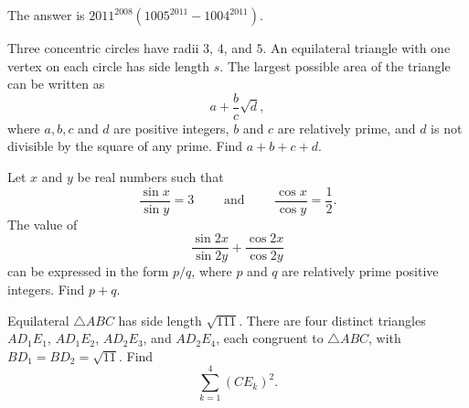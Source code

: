 \begin{solution}
	The answer is $\boxed{2011^{2008}(1005^{2011}-1004^{2011})}$.
\end{solution}






\begin{question}[name={2012 AIME I, \href{https://artofproblemsolving.com/community/c4p2630571}{Problem 13}}]
	Three concentric circles have radii $3$, $4$, and $5$. An equilateral triangle with one vertex on each circle has side length $s$. The largest possible area of the triangle can be written as $$a+\frac{b}{c}\sqrt{d},$$ where $a,b,c$ and $d$ are positive integers, $b$ and $c$ are relatively prime, and $d$ is not divisible by the square of any prime. Find $a+b+c+d$.
\end{question}


%	










\begin{question}[name={2012 AIME II, \href{https://artofproblemsolving.com/community/c4p2644151}{Problem 9}}]
	Let $x$ and $y$ be real numbers such that $$\frac{\sin{x}}{\sin{y}} = 3 \qquad \text{ and } \qquad \frac{\cos{x}}{\cos{y}} = \frac{1}{2}.$$ The value of $$\frac{\sin{2x}}{\sin{2y}} + \frac{\cos{2x}}{\cos{2y}}$$ can be expressed in the form ${p}/{q}$, where $p$ and $q$ are relatively prime positive integers. Find $p + q$.	
\end{question}


%	












\begin{question}[name={2012 AIME II, \href{https://artofproblemsolving.com/community/c4p2644178}{Problem 13}}]
	Equilateral $\triangle ABC$ has side length $\sqrt{111}$. There are four distinct triangles $AD_1E_1$, $AD_1E_2$, $AD_2E_3$, and $AD_2E_4$, each congruent to $\triangle ABC$, with $BD_1 = BD_2=\sqrt{11}$. Find $$\sum^4_{k=1}(CE_k)^2.$$
\end{question}


